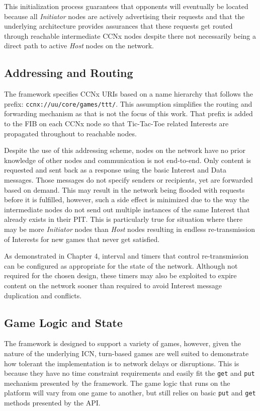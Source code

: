 \documentclass[a4paper,12pt]{report}      %
\begin{document}
This initialization process guarantees that opponents will eventually be located because all \emph{Initiator}
nodes are actively advertising their requests and that the underlying architecture provides assurances
that these requests get routed through reachable intermediate CCNx nodes despite there not necessarily
being a direct path to active \emph{Host} nodes on the network.

\subsection{Addressing and Routing}

The framework specifies CCNx URIs based on a name hierarchy that follows the prefix:    
\verb!ccnx://uu/core/games/ttt/!. This assumption simplifies the routing and forwarding mechanism as that is not the focus of this work. That prefix is added to the FIB on each CCNx node so that Tic-Tac-Toe related Interests are propagated throughout to reachable nodes.

Despite the use of this addressing scheme, nodes on the network have no prior knowledge of other
nodes and communication is not end-to-end. Only content is requested and sent back
as a response using the basic Interest and Data messages. Those messages do not specify senders or
recipients, yet are forwarded based on demand. This may result in the network being flooded with
requests before it is fulfilled, however, such a side effect is minimized due to the way the intermediate
nodes do not send out multiple instances of the same Interest that already exists in their PIT. This is
particularly true for situation where there may be more \emph{Initiator} nodes than \emph{Host} nodes resulting in
endless re-transmission of Interests for new games that never get satisfied.

As demonstrated in Chapter 4, interval and timers that control re-transmission can be configured as
appropriate for the state of the network. Although not required for the chosen design, these timers may
also be exploited to expire content on the network sooner than required to avoid Interest message
duplication and conflicts.

\subsection{Game Logic and State}

The framework is designed to support a variety of games, however, given the nature of the underlying
ICN, turn-based games are well suited to demonstrate how tolerant the implementation is
to network delays or disruptions. This is because they have no time constraint requirements and easily fit the
\verb!get! and \verb!put! mechanism presented by the framework. The game logic that runs on the platform will vary
 from one game to another, but still relies on basic \verb!put! and \verb!get! methods presented by the API.
\end{document}
